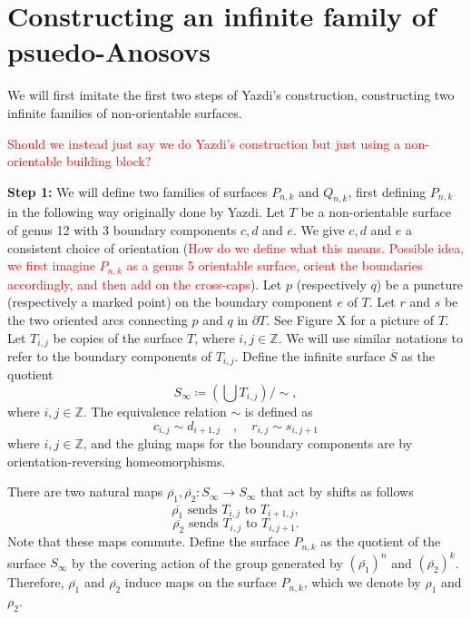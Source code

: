 \section{Constructing an infinite family of psuedo-Anosovs}
\label{sec:constr-an-infin}

We will first imitate the first two steps of Yazdi's construction, constructing two infinite families of non-orientable surfaces.

\textcolor{red}{Should we instead just say we do Yazdi's construction but just using a non-orientable building block?}

\textbf{Step 1:} We will define two families of surfaces $P_{n,k}$ and $Q_{n,k}$, first defining $P_{n,k}$ in the following way originally done by Yazdi. Let $T$ be a non-orientable surface of genus 12 with 3 boundary components $c,d$ and $e$. We give $c, d$ and $e$ a consistent choice of orientation (\textcolor{red}{How do we define what this means. Possible idea, we first imagine $P_{n,k}$ as a genus 5 orientable surface, orient the boundaries accordingly, and then add on the cross-caps}). Let $p$ (respectively $q$) be a puncture (respectively a marked point) on the boundary component $e$ of $T$. Let $r$ and $s$ be the two oriented arcs connecting $p$ and $q$ in $\partial T$. See Figure X for a picture of $T$. Let $T_{i,j}$ be copies of the surface $T$, where $i,j \in \mathbb{Z}$. We will use similar notations to refer to the boundary components of $T_{i,j}$. Define the infinite surface $\overline{S}$ as the quotient
$$S_\infty \coloneqq \left( \bigcup T_{i,j} \right)/\sim,$$
where $i,j \in \mathbb{Z}$. The equivalence relation $\sim$ is defined as $$c_{i,j} \sim d_{i+1,j} \hspace{1em}, \hspace{1em} r_{i,j} \sim s_{i,j+1}$$ where $i,j \in \mathbb{Z}$, and the gluing maps for the boundary components are by orientation-reversing homeomorphisms.

There are two natural maps $\overline{\rho_1},\overline{\rho_2}: S_\infty \xrightarrow[]{} S_\infty$ that act by shifts as follows $$\overline{\rho_1} \text{ sends } T_{i,j} \text{ to } T_{i+1,j},$$ $$\overline{\rho_2} \text{ sends } T_{i,j} \text{ to } T_{i,j+1}.$$ Note that these maps commute. Define the surface $P_{n,k}$ as the quotient of the surface $S_\infty$ by the covering action of the group generated by $(\overline{\rho_1})^n$ and $(\overline{\rho_2})^k$. Therefore, $\overline{\rho_1}$ and $\overline{\rho_2}$ induce maps on the surface $P_{n,k}$, which we denote by $\rho_1$ and $\rho_2$.

